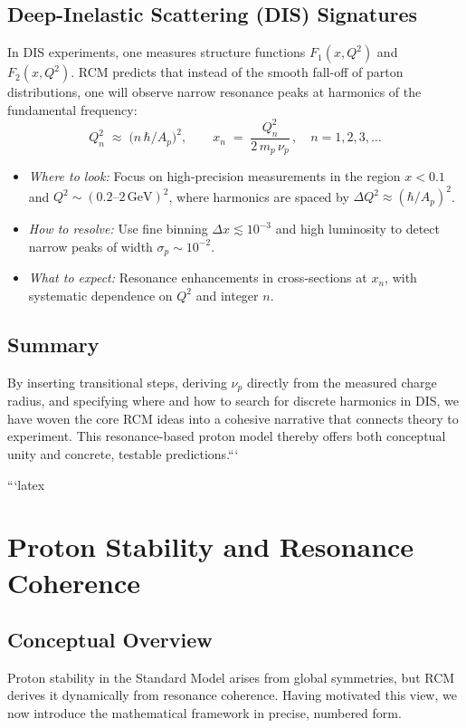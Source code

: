\subsection{Deep-Inelastic Scattering (DIS) Signatures}
In DIS experiments, one measures structure functions \(F_1(x,Q^2)\) and \(F_2(x,Q^2)\).  RCM predicts that instead of the smooth fall-off of parton distributions, one will observe narrow resonance peaks at harmonics of the fundamental frequency:
\[
Q_n^2 \;\approx\;\bigl(n\,\hbar/A_p\bigr)^2,
\qquad
x_n \;=\;\frac{Q_n^2}{2\,m_p\,\nu_p}\,,
\quad n=1,2,3,\dots
\]
\begin{itemize}
  \item \emph{Where to look:}  Focus on high-precision measurements in the region \(x<0.1\) and \(Q^2\sim(0.2\text{–}2\,\mathrm{GeV})^2\), where harmonics are spaced by \(\Delta Q^2\approx(\hbar/A_p)^2\).  
  \item \emph{How to resolve:}  Use fine binning \(\Delta x\lesssim10^{-3}\) and high luminosity to detect narrow peaks of width \(\sigma_p\sim10^{-2}\).  
  \item \emph{What to expect:}  Resonance enhancements in cross-sections at \(x_n\), with systematic dependence on \(Q^2\) and integer \(n\).
\end{itemize}

\subsection{Summary}
By inserting transitional steps, deriving \(\nu_p\) directly from the measured charge radius, and specifying where and how to search for discrete harmonics in DIS, we have woven the core RCM ideas into a cohesive narrative that connects theory to experiment.  This resonance-based proton model thereby offers both conceptual unity and concrete, testable predictions.```

```latex
\section{Proton Stability and Resonance Coherence}

\subsection{Conceptual Overview}
Proton stability in the Standard Model arises from global symmetries, but RCM derives it dynamically from resonance coherence.  Having motivated this view, we now introduce the mathematical framework in precise, numbered form.

